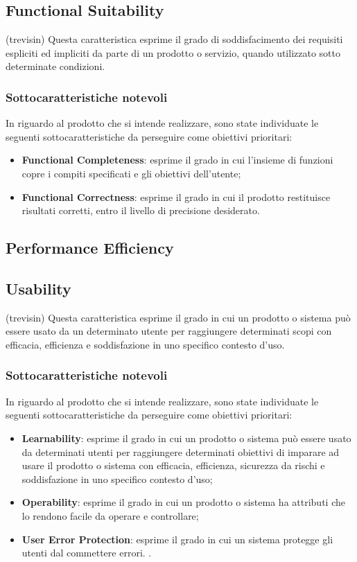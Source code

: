 
\subsection{Functional Suitability} (trevisin)
Questa caratteristica esprime il grado di soddisfacimento dei requisiti espliciti ed impliciti da parte di un prodotto o servizio, quando utilizzato sotto determinate condizioni.
\subsubsection{Sottocaratteristiche notevoli}
In riguardo al prodotto che si intende realizzare, sono state individuate le seguenti sottocaratteristiche da perseguire come obiettivi prioritari: 
\begin{itemize}
	\item{\textbf{Functional Completeness}}: esprime il grado in cui l'insieme di funzioni copre i compiti specificati e gli obiettivi dell'utente;
	\item{\textbf{Functional Correctness}}: esprime il grado in cui il prodotto restituisce risultati corretti, entro il livello di precisione desiderato.
\end{itemize}

\subsection{Performance Efficiency} 

\subsection{Usability} (trevisin)
Questa caratteristica esprime il grado in cui un prodotto o sistema può essere usato da un determinato utente per raggiungere determinati scopi con efficacia, efficienza e soddisfazione in uno specifico contesto d'uso.
\subsubsection{Sottocaratteristiche notevoli}
In riguardo al prodotto che si intende realizzare, sono state individuate le seguenti sottocaratteristiche da perseguire come obiettivi prioritari:
\begin{itemize}
	\item{\textbf{Learnability}}: esprime il grado in cui un prodotto o sistema può essere usato da determinati utenti per raggiungere determinati obiettivi di imparare ad usare il prodotto o sistema  con efficacia, efficienza, sicurezza da rischi e soddisfazione in uno specifico contesto d'uso;
	\item{\textbf{Operability}}: esprime il grado in cui un prodotto o sistema ha attributi che lo rendono facile da operare e controllare;
	\item{\textbf{User Error Protection}}: esprime il grado in cui un sistema protegge gli utenti dal commettere errori.
	.
\end{itemize}

